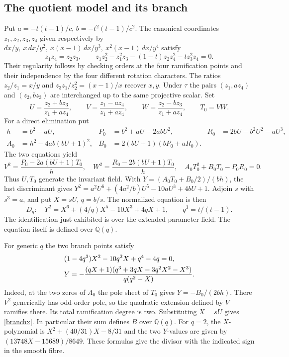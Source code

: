 \documentclass[11pt]{article}
\newcommand{\Q}{\mathbb Q}
\begin{document}
\subsection{The quotient model and its branch}
Put $a=-t(t-1)/c$, $b=-t^2(t-1)/c^2$. The canonical coordinates
$z_1,z_2,z_3,z_4$ given respectively by
$dx/y,\ x\,dx/y^2,\ x(x-1)\,dx/y^3,\ x^2(x-1)\,dx/y^4$ satisfy
\[
 z_1z_4=z_2z_3,\qquad
 z_1z_2^2-z_1^2z_3-(1-t)z_2z_4^2-tz_3^2z_4=0.
\]
Their regularity follows by checking orders at the four ramification
points and their independence by the four different rotation characters.
The ratios $z_2/z_1=x/y$ and $z_3z_1/z_2^2=(x-1)/x$ recover $x,y$.
Under $\tau$ the pairs $(z_1,az_4)$ and $(z_2,bz_3)$ are interchanged
up to the same projective scalar. Set
\[
 U=\frac{z_2+bz_3}{z_1+az_4},\qquad
 V=\frac{z_1-az_4}{z_1+az_4},\qquad
 W=\frac{z_2-bz_3}{z_1+az_4},\qquad T_0=VW.
\]
For a direct elimination put
\begin{align*}
 h&=b^2-aU,& P_0&=b^2+aU-2abU^2,& R_0&=2bU-b^2U^2-aU^3,\\
 A_0&=h^2-4ab(bU+1)^2,& B_0&=2(bU+1)(bP_0+aR_0).
\end{align*}
The two equations yield
\[
 V^2=\frac{P_0-2a(bU+1)T_0}{h},\quad
 W^2=\frac{R_0-2b(bU+1)T_0}{h},\quad A_0T_0^2+B_0T_0-P_0R_0=0.
\]
Thus $U,T_0$ generate the invariant field. With
$Y=(A_0T_0+B_0/2)/(bh)$, the last discriminant gives
$Y^2=a^2U^6+(4a^2/b)U^5-10aU^3+4bU+1$.
Adjoin $s$ with $s^3=a$, and put $X=sU$, $q=b/s$.
The normalized equation is then
\begin{equation}\label{four}
 D_q:\quad Y^2=X^6+(4/q)X^5-10X^3+4qX+1,\qquad q^3=t/(t-1).
\end{equation}
The identification just exhibited is over the extended parameter field.
The equation itself is defined over $\Q(q)$.

For generic $q$ the two branch points satisfy
\begin{align}
 &(1-4q^3)X^2-10q^2X+q^4-4q=0,\label{branchx}\\
 &Y=-\frac{(qX+1)(q^3+3qX-3q^2X^2-X^3)}{q(q^2-X)}.\notag
\end{align}
Indeed, at the two zeros of $A_0$ the pole sheet of $T_0$ gives
$Y=-B_0/(2bh)$. There $V^2$ generically has odd-order pole, so
the quadratic extension defined by $V$ ramifies there. Its total
ramification degree is two. Substituting $X=sU$ gives
\eqref{branchx}. In particular their sum defines $B$ over $\Q(q)$.
For $q=2$, the $X$-polynomial is $X^2+(40/31)X-8/31$ and the two
$Y$-values are given by $(13748X-15689)/8649$. These formulas give
the divisor with the indicated sign in the smooth fibre.
\end{document}

